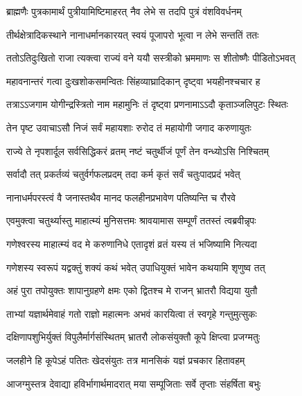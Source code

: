 \twolineshloka
{ब्राह्मणैः पुत्रकामार्थं पुत्रीयामिष्टिमाहरत्}
{नैव लेभे स तदपि पुत्रं वंशविवर्धनम्} %

\twolineshloka
{तीर्थक्षेत्रादिकस्थाने नानाधर्मानकारयत्}
{स्वयं पूजापरो भूत्वा न लेभे सन्ततिं ततः} %

\twolineshloka
{ततोऽतिदुःखितो राजा त्यक्त्वा राज्यं वने ययौ}
{सस्त्रीको भ्रममाणः स शीतोष्णैः पीडितोऽभवत्} %

\twolineshloka
{महावनान्तरं गत्वा दुःखशोकसमन्वितः}
{सिंहव्याघ्रादिकान् दृष्ट्वा भयहीनश्चचार ह} %

\twolineshloka
{तत्राऽऽजगाम योगीन्द्रस्त्रितो नाम महामुनिः}
{तं दृष्ट्वा प्रणनामाऽऽदौ कृताञ्जलिपुटः स्थितः} %

\twolineshloka
{तेन पृष्ट उवाचाऽसौ निजं सर्वं महायशाः}
{रुरोद तं महायोगी जगाद करुणायुतः} %


\twolineshloka
{राज्ये ते नृपशार्दूल सर्वसिद्धिकरं व्रतम्}
{नष्टं चतुर्थीजं पूर्णं तेन वन्ध्योऽसि निश्चितम्} %

\twolineshloka
{सर्वादौ तत् प्रकर्तव्यं चतुर्वर्गफलप्रदम्}
{तदा कर्म कृतं सर्वं चतुःपादप्रदं भवेत्} %

\twolineshloka
{नानाधर्मपरस्त्वं वै जनास्तथैव मानद}
{फलहीनप्रभावेण पतिष्यन्ति च रौरवे} %

\twolineshloka
{एवमुक्त्वा चतुर्थ्यास्तु माहात्म्यं मुनिसत्तमः}
{श्रावयामास सम्पूर्णं ततस्तं त्वब्रवीन्नृपः} %


\twolineshloka
{गणेश्वरस्य माहात्म्यं वद मे करुणानिधे}
{एतादृशं व्रतं यस्य तं भजिष्यामि नित्यदा} %


\twolineshloka
{गणेशस्य स्वरूपं यद्वक्तुं शक्यं कथं भवेत्}
{उपाधियुक्तं भावेन कथयामि श‍ृणुष्व तत्} %

\twolineshloka
{अहं पुरा तपोयुक्तः शापानुग्रहणे क्षमः}
{एको द्वितश्च मे राजन् भ्रातरौ विद्यया युतौ} %

\twolineshloka
{ताभ्यां यज्ञार्थमेवाहं गतो राज्ञो महात्मनः}
{अभवं कारयित्वा तं स्वगृहे गन्तुमुत्सुकः} %

\twolineshloka
{दक्षिणापशुभिर्युक्तं विपुलैर्मार्गसंस्थितम्}
{भ्रातरौ लोकसंयुक्तौ कूपे क्षिप्त्वा प्रजग्मतुः} %

\twolineshloka
{जलहीने हि कूपेऽहं पतितः खेदसंयुतः}
{तत्र मानसिकं यज्ञं प्रचकार हितावहम्} %

\twolineshloka
{आजग्मुस्तत्र देवाद्या हविर्भागार्थमादरात्}
{मया सम्पूजिताः सर्वे तृप्ताः संहर्षिता बभुः} %

